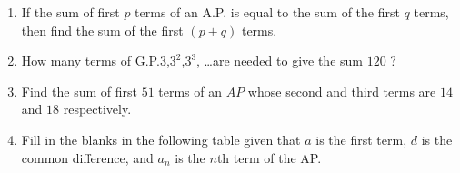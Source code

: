 \begin{enumerate}[label=\thesection.\arabic*,ref=\thesection.\theenumi]
\item If the sum of first $p$ terms of an A.P. is equal to the sum of the first $q$ terms, then find the sum of the first $(p + q)$ terms.\\
\solution
\pagebreak
\item How many terms of G.P.$3$,$3^2$,$3^3$, \ldots are needed to give the sum $120$ ?\\
\solution

\pagebreak

\item Find the sum of first $51$ terms of an $AP$ whose second and third terms are $14$ and $18$ respectively. \\
\solution

\pagebreak

\item Fill in the blanks in the following table given that $a$ is the first term, $d$ is the common difference, and $a_n$ is the $n$th term of the AP.\\
\begin{table}[h!]
  \centering
  
   \label{tab:ESTable1}
\end{table}
\solution

\pagebreak
\end{enumerate}

